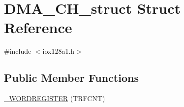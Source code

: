 \hypertarget{struct_d_m_a___c_h__struct}{
\section{DMA\_\-CH\_\-struct Struct Reference}
\label{struct_d_m_a___c_h__struct}
}


{\ttfamily \#include $<$iox128a1.h$>$}

\subsection*{Public Member Functions}
\begin{DoxyCompactItemize}
\item 
\hyperlink{struct_d_m_a___c_h__struct_ad1b73e9872aeeac70108f2102563551e}{\_\-WORDREGISTER} (TRFCNT)
\end{DoxyCompactItemize}
